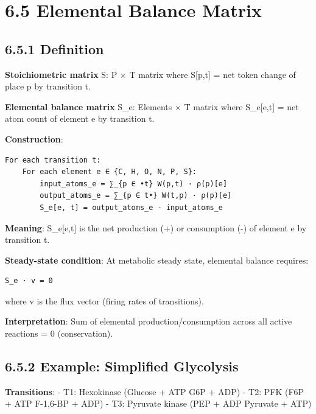 \hypertarget{elemental-balance-matrix}{%
\section{6.5 Elemental Balance Matrix}\label{elemental-balance-matrix}}

\hypertarget{definition}{%
\subsection{6.5.1 Definition}\label{definition}}

\textbf{Stoichiometric matrix} S: \textbar P\textbar{} ×
\textbar T\textbar{} matrix where S{[}p,t{]} = net token change of place
p by transition t.

\textbf{Elemental balance matrix} S\_e: \textbar Elements\textbar{} ×
\textbar T\textbar{} matrix where S\_e{[}e,t{]} = net atom count of
element e by transition t.

\textbf{Construction}:

\begin{lstlisting}
For each transition t:
    For each element e ∈ {C, H, O, N, P, S}:
        input_atoms_e = ∑_{p ∈ •t} W(p,t) · ρ(p)[e]
        output_atoms_e = ∑_{p ∈ t•} W(t,p) · ρ(p)[e]
        S_e[e, t] = output_atoms_e - input_atoms_e
\end{lstlisting}

\textbf{Meaning}: S\_e{[}e,t{]} is the net production (+) or consumption
(-) of element e by transition t.

\textbf{Steady-state condition}: At metabolic steady state, elemental
balance requires:

\begin{lstlisting}
S_e · v = 0
\end{lstlisting}

where v is the flux vector (firing rates of transitions).

\textbf{Interpretation}: Sum of elemental production/consumption across
all active reactions = 0 (conservation).

\hypertarget{example-simplified-glycolysis}{%
\subsection{6.5.2 Example: Simplified
Glycolysis}\label{example-simplified-glycolysis}}

\textbf{Transitions}: - T1: Hexokinase (Glucose + ATP \textrightarrow G6P + ADP) - T2:
PFK (F6P + ATP \textrightarrow F-1,6-BP + ADP) - T3: Pyruvate kinase (PEP + ADP \textrightarrow
Pyruvate + ATP)

